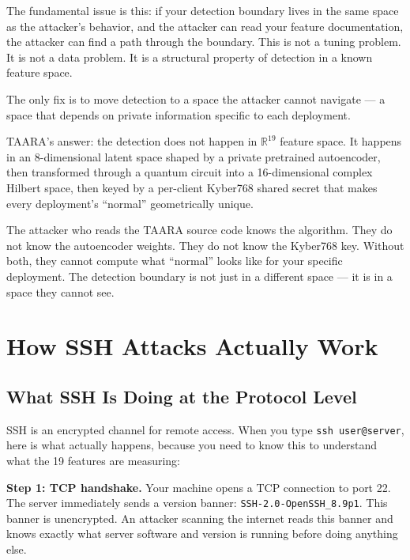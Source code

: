 \documentclass[11pt,a4paper]{article}
\begin{document}
\begin{warning}
The fundamental issue is this: if your detection boundary lives in the same space as the attacker's behavior, and the attacker can read your feature documentation, the attacker can find a path through the boundary. This is not a tuning problem. It is not a data problem. It is a structural property of detection in a known feature space.

The only fix is to move detection to a space the attacker cannot navigate — a space that depends on private information specific to each deployment.
\end{warning}

TAARA's answer: the detection does not happen in $\mathbb{R}^{19}$ feature space. It happens in an 8-dimensional latent space shaped by a private pretrained autoencoder, then transformed through a quantum circuit into a 16-dimensional complex Hilbert space, then keyed by a per-client Kyber768 shared secret that makes every deployment's ``normal'' geometrically unique.

The attacker who reads the TAARA source code knows the algorithm. They do not know the autoencoder weights. They do not know the Kyber768 key. Without both, they cannot compute what ``normal'' looks like for your specific deployment. The detection boundary is not just in a different space — it is in a space they cannot see.

\section{How SSH Attacks Actually Work}

\subsection{What SSH Is Doing at the Protocol Level}

SSH is an encrypted channel for remote access. When you type \texttt{ssh user@server}, here is what actually happens, because you need to know this to understand what the 19 features are measuring:

\textbf{Step 1: TCP handshake.} Your machine opens a TCP connection to port 22. The server immediately sends a version banner: \texttt{SSH-2.0-OpenSSH\_8.9p1}. This banner is unencrypted. An attacker scanning the internet reads this banner and knows exactly what server software and version is running before doing anything else.
\end{document}
